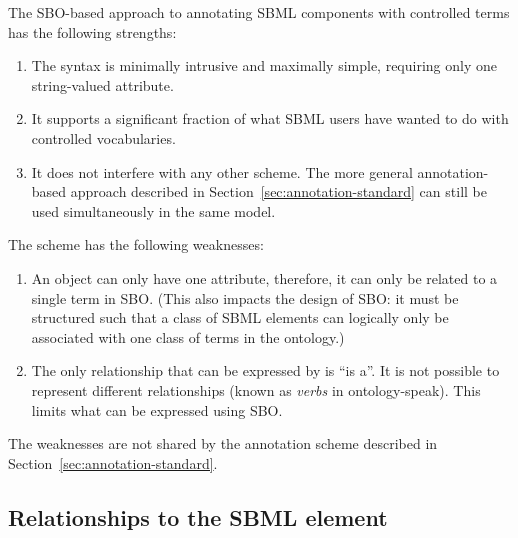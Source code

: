 The SBO-based approach to annotating SBML components with
controlled terms has the following strengths:
\begin{enumerate}

\item The syntax is minimally intrusive and maximally simple,
  requiring only one string-valued attribute.

\item It supports a significant fraction of what SBML users have wanted
  to do with controlled vocabularies.

\item It does not interfere with any other scheme.  The more
  general annotation-based approach described in
  Section~\ref{sec:annotation-standard} can still be used
  simultaneously in the same model.

\end{enumerate}

The scheme has the following weaknesses:
\begin{enumerate}

\item An object can only have one  attribute,
  therefore, it can only be related to a single term in SBO.
  (This also impacts the design of SBO: it must be structured such
  that a class of SBML elements can logically only be associated
  with one class of terms in the ontology.)

\item The only relationship that can be expressed by
   is ``is a''.  It is not possible to represent
  different relationships (known as \emph{verbs} in
  ontology-speak).  This limits what can be expressed using SBO.

\end{enumerate}

\begin{blockChanged}

The weaknesses are not shared by the annotation scheme described
in Section~\ref{sec:annotation-standard}.  

\end{blockChanged}

\subsection{Relationships to the SBML  element}

